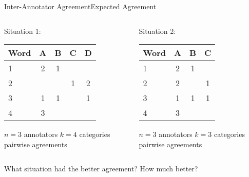 \documentclass[aspectratio=169]{beamer}
\begin{document}
%
%

\begin{frame}{Inter-Annotator Agreement}{Expected Agreement}
\begin{columns}[T]
\begin{column}{.45\paperwidth}
Situation 1:

\begin{tabular}{lcccc}
\toprule
Word & A & B & C & D \\
\midrule
1 & 2 & 1 &   &   \\
2 &   &   & 1 & 2 \\
3 & 1 & 1 &   & 1 \\
4 & 3 &   &   &   \\
\bottomrule
\end{tabular}
\begin{outline}
\1 $n=3$ annotators
\1 $k=4$ categories
 pairwise agreements
\end{outline}
\end{column}

\begin{column}{.45\paperwidth}
Situation 2:

\begin{tabular}{lccc}
\toprule
Word & A & B & C \\
\midrule
1 & 2 & 1 &   \\
2 & 2 &   & 1 \\
3 & 1 & 1 & 1 \\
4 & 3 &   &   \\
\bottomrule
\end{tabular}
\begin{outline}
\1 $n=3$ annotators
\1 $k=3$ categories
 pairwise agreements
\end{outline}
\end{column}
\end{columns}
\vspace{2em}
What situation had the better agreement?
How much better?
\end{frame}
\end{document}
